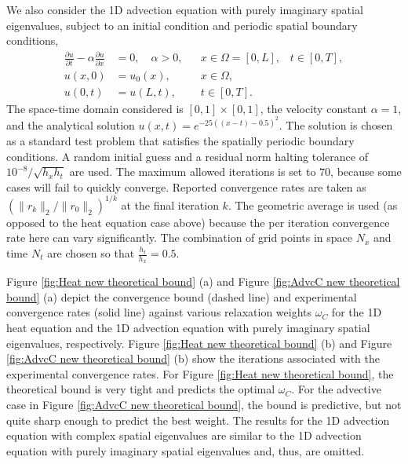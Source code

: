 \documentclass[VANCOUVER,STIX1COL]{WileyNJD-v2}
\begin{document}
We also consider the 1D advection equation with purely imaginary spatial eigenvalues, subject to an initial condition and periodic spatial boundary conditions,
\begin{align}
\frac{\partial u}{\partial t} - \alpha \frac{\partial u}{\partial x} &= 0, 
\quad \alpha > 0, && x \in \Omega = [0, L], \hspace{10pt} t \in [0, T], \nonumber \\
u(x, 0) &= u_0(x), && x \in \Omega, \\
u(0, t) &= u(L, t), && t \in [0, T].\nonumber
\end{align}
The space-time domain considered is $[0, 1]\times [0, 1]$, the velocity constant $\alpha = 1$, and the analytical solution 
$u(x, t) = e^{-25((x - t) - 0.5)^2}$.
The solution is chosen as a standard test problem that satisfies the spatially periodic boundary conditions.
A random initial guess and a residual norm halting tolerance of $ 10^{-8} / \sqrt{h_x h_t}$ are used.  The maximum allowed
iterations is set to $70$, because some cases will fail to quickly converge. 
Reported convergence rates are taken as $( \| r_k \|_2 / \| r_0 \|_2 )^{1/k}$ at the final iteration $k$.  The geometric average is used (as opposed to the heat equation case above) because the per iteration convergence rate here can vary significantly. The combination of grid points in space $N_x$ and time $N_t$ are chosen so that $\frac{h_t}{h_x} = 0.5$.
%

Figure \ref{fig:Heat new theoretical bound} (a) and Figure \ref{fig:AdvcC new theoretical bound} (a) depict the convergence bound (dashed line) and experimental convergence rates (solid line) against various relaxation weights $\omega_C$ for the 1D heat equation and the 1D advection equation with purely imaginary spatial eigenvalues, respectively. Figure \ref{fig:Heat new theoretical bound} (b) and Figure \ref{fig:AdvcC new theoretical bound} (b) show the iterations associated with the experimental convergence rates. For Figure \ref{fig:Heat new theoretical bound}, the theoretical bound is very tight and predicts the optimal $\omega_C$. For the advective case in Figure \ref{fig:AdvcC new theoretical bound}, the bound is predictive, but not quite sharp enough to predict the best weight. The results for the 1D advection equation with complex spatial eigenvalues are similar to the 1D advection equation with purely imaginary spatial eigenvalues and, thus, are omitted.
\end{document}
